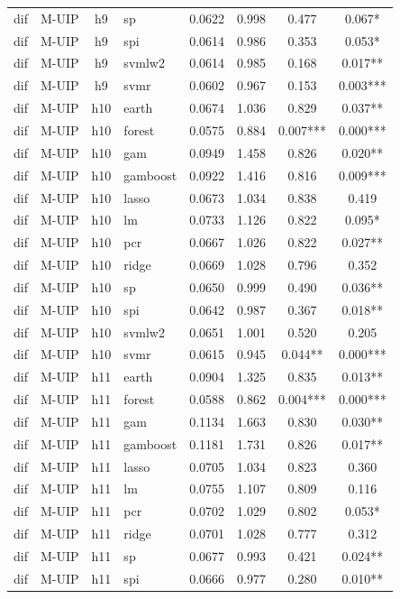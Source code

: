 \begin{ThreePartTable}
\begin{longtable}[t]{llclcccc}
dif & M-UIP & h9 & sp & 0.0622 & 0.998 & 0.477 & 0.067*\\
dif & M-UIP & h9 & spi & 0.0614 & 0.986 & 0.353 & 0.053*\\
dif & M-UIP & h9 & svmlw2 & 0.0614 & 0.985 & 0.168 & 0.017**\\
dif & M-UIP & h9 & svmr & 0.0602 & 0.967 & 0.153 & 0.003***\\
\addlinespace
dif & M-UIP & h10 & earth & 0.0674 & 1.036 & 0.829 & 0.037**\\
dif & M-UIP & h10 & forest & 0.0575 & 0.884 & 0.007*** & 0.000***\\
dif & M-UIP & h10 & gam & 0.0949 & 1.458 & 0.826 & 0.020**\\
dif & M-UIP & h10 & gamboost & 0.0922 & 1.416 & 0.816 & 0.009***\\
dif & M-UIP & h10 & lasso & 0.0673 & 1.034 & 0.838 & 0.419\\
dif & M-UIP & h10 & lm & 0.0733 & 1.126 & 0.822 & 0.095*\\
dif & M-UIP & h10 & pcr & 0.0667 & 1.026 & 0.822 & 0.027**\\
dif & M-UIP & h10 & ridge & 0.0669 & 1.028 & 0.796 & 0.352\\
dif & M-UIP & h10 & sp & 0.0650 & 0.999 & 0.490 & 0.036**\\
dif & M-UIP & h10 & spi & 0.0642 & 0.987 & 0.367 & 0.018**\\
dif & M-UIP & h10 & svmlw2 & 0.0651 & 1.001 & 0.520 & 0.205\\
dif & M-UIP & h10 & svmr & 0.0615 & 0.945 & 0.044** & 0.000***\\
\addlinespace
dif & M-UIP & h11 & earth & 0.0904 & 1.325 & 0.835 & 0.013**\\
dif & M-UIP & h11 & forest & 0.0588 & 0.862 & 0.004*** & 0.000***\\
dif & M-UIP & h11 & gam & 0.1134 & 1.663 & 0.830 & 0.030**\\
dif & M-UIP & h11 & gamboost & 0.1181 & 1.731 & 0.826 & 0.017**\\
dif & M-UIP & h11 & lasso & 0.0705 & 1.034 & 0.823 & 0.360\\
dif & M-UIP & h11 & lm & 0.0755 & 1.107 & 0.809 & 0.116\\
dif & M-UIP & h11 & pcr & 0.0702 & 1.029 & 0.802 & 0.053*\\
dif & M-UIP & h11 & ridge & 0.0701 & 1.028 & 0.777 & 0.312\\
dif & M-UIP & h11 & sp & 0.0677 & 0.993 & 0.421 & 0.024**\\
dif & M-UIP & h11 & spi & 0.0666 & 0.977 & 0.280 & 0.010**\\

\end{longtable}
\end{ThreePartTable}
